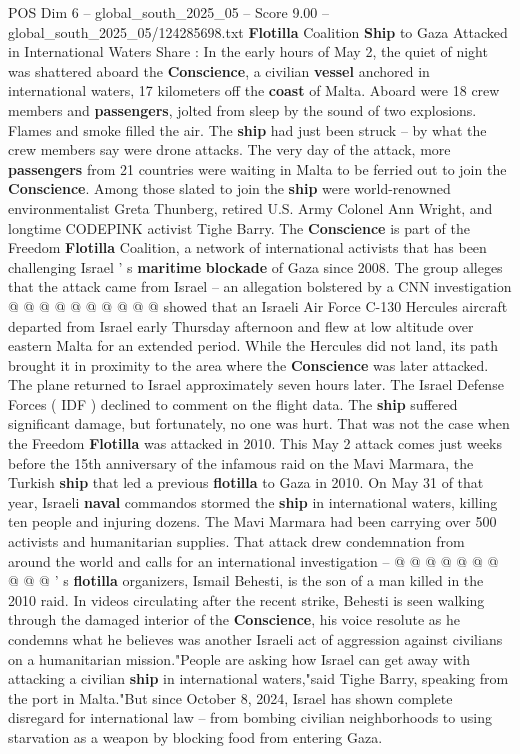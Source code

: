 \begin{textsample}{POS Dim 6 – global\_south\_2025\_05 – Score 9.00 – global\_south\_2025\_05/124285698.txt}  \label{ex:f6_pos_055}
\textbf{Flotilla} Coalition \textbf{Ship} to Gaza Attacked in International Waters Share : In the early hours of May 2, the quiet of night was shattered aboard the \textbf{Conscience}, a civilian \textbf{vessel} anchored in international waters, 17 kilometers off the \textbf{coast} of Malta.
Aboard were 18 crew members and \textbf{passengers}, jolted from sleep by the sound of two explosions.
Flames and smoke filled the air.
The \textbf{ship} had just been struck -- by what the crew members say were drone attacks.
The very day of the attack, more \textbf{passengers} from 21 countries were waiting in Malta to be ferried out to join the \textbf{Conscience}.
Among those slated to join the \textbf{ship} were world-renowned environmentalist Greta Thunberg, retired U.S.
Army Colonel Ann Wright, and longtime CODEPINK activist Tighe Barry.
The \textbf{Conscience} is part of the Freedom \textbf{Flotilla} Coalition, a network of international activists that has been challenging Israel ' s \textbf{maritime} \textbf{blockade} of Gaza since 2008.
The group alleges that the attack came from Israel -- an allegation bolstered by a CNN investigation @ @ @ @ @ @ @ @ @ @ showed that an Israeli Air Force C-130 Hercules aircraft departed from Israel early Thursday afternoon and flew at low altitude over eastern Malta for an extended period.
While the Hercules did not land, its path brought it in proximity to the area where the \textbf{Conscience} was later attacked.
The plane returned to Israel approximately seven hours later.
The Israel Defense Forces ( IDF ) declined to comment on the flight data.
The \textbf{ship} suffered significant damage, but fortunately, no one was hurt.
That was not the case when the Freedom \textbf{Flotilla} was attacked in 2010.
This May 2 attack comes just weeks before the 15th anniversary of the infamous raid on the Mavi Marmara, the Turkish \textbf{ship} that led a previous \textbf{flotilla} to Gaza in 2010.
On May 31 of that year, Israeli \textbf{naval} commandos stormed the \textbf{ship} in international waters, killing ten people and injuring dozens.
The Mavi Marmara had been carrying over 500 activists and humanitarian supplies.
That attack drew condemnation from around the world and calls for an international investigation -- @ @ @ @ @ @ @ @ @ @ ' s \textbf{flotilla} organizers, Ismail Behesti, is the son of a man killed in the 2010 raid.
In videos circulating after the recent strike, Behesti is seen walking through the damaged interior of the \textbf{Conscience}, his voice resolute as he condemns what he believes was another Israeli act of aggression against civilians on a humanitarian mission."People are asking how Israel can get away with attacking a civilian \textbf{ship} in international waters,"said Tighe Barry, speaking from the port in Malta."But since October 8, 2024, Israel has shown complete disregard for international law -- from bombing civilian neighborhoods to using starvation as a weapon by blocking food from entering Gaza.

\end{textsample}
